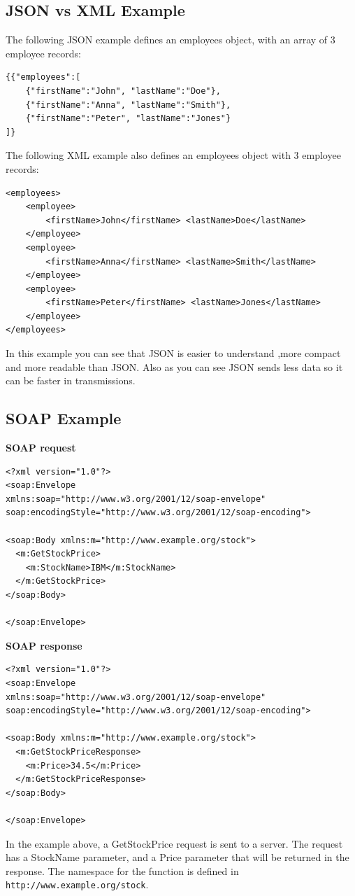 \documentclass[12pt]{article}
\begin{document}
\subsection{JSON vs XML Example}
\label{sec:json}
The following JSON example defines an employees object, with an array of 3 employee records:
\begin{lstlisting}
{{"employees":[
    {"firstName":"John", "lastName":"Doe"}, 
    {"firstName":"Anna", "lastName":"Smith"},
    {"firstName":"Peter", "lastName":"Jones"}
]}
\end{lstlisting}
The following XML example also defines an employees object with 3 employee records:
\begin{lstlisting}
<employees>
    <employee>
        <firstName>John</firstName> <lastName>Doe</lastName>
    </employee>
    <employee>
        <firstName>Anna</firstName> <lastName>Smith</lastName>
    </employee>
    <employee>
        <firstName>Peter</firstName> <lastName>Jones</lastName>
    </employee>
</employees>
\end{lstlisting}
In this example you can see that JSON is easier to understand ,more compact and more readable than JSON.
Also as you can see JSON sends less data so it can be faster in transmissions.\cite{jsonxml}
\subsection{SOAP Example}
\label{sec:soapeexample}
\textbf{SOAP request}\\
\begin{lstlisting}
<?xml version="1.0"?>
<soap:Envelope
xmlns:soap="http://www.w3.org/2001/12/soap-envelope"
soap:encodingStyle="http://www.w3.org/2001/12/soap-encoding">

<soap:Body xmlns:m="http://www.example.org/stock">
  <m:GetStockPrice>
    <m:StockName>IBM</m:StockName>
  </m:GetStockPrice>
</soap:Body>

</soap:Envelope>
\end{lstlisting}
\textbf{SOAP response}
\begin{lstlisting}
<?xml version="1.0"?>
<soap:Envelope
xmlns:soap="http://www.w3.org/2001/12/soap-envelope"
soap:encodingStyle="http://www.w3.org/2001/12/soap-encoding">

<soap:Body xmlns:m="http://www.example.org/stock">
  <m:GetStockPriceResponse>
    <m:Price>34.5</m:Price>
  </m:GetStockPriceResponse>
</soap:Body>

</soap:Envelope>
\end{lstlisting}
In the example above, a GetStockPrice request is sent to a server. The request has a StockName parameter, and a Price parameter that will be returned in the response. The namespace for the function is defined in \texttt{http://www.example.org/stock}.\cite{soap}\\
\newpage
\end{document}
